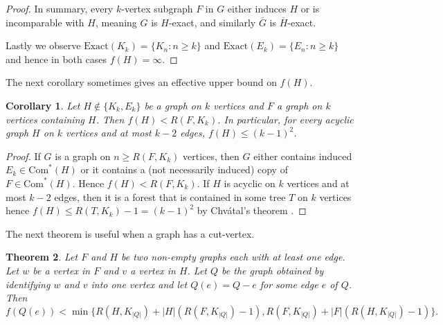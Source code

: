 \documentclass[a4paper,12pt]{article}
\newtheorem{theorem}{Theorem}[section]
\newtheorem{corollary}[theorem]{Corollary}
\begin{document}
\begin{proof}
In summary, every $k$-vertex subgraph $F$ in $G$ either induces $H$ or is incomparable with $H$, meaning $G$ is $H$-exact, and similarly  $\overline{G}$ is $\overline{H}$-exact.

 
Lastly we observe $\text{Exact}(K_k)=\{K_n: n\geq k\}$ and $\text{Exact}(E_k)=\{E_n: n\geq k\}$ and hence in both cases $f(H)= \infty$.
\end{proof}
The next corollary sometimes gives an effective upper bound on $f(H)$. 

\begin{corollary} \label{ub_ramsey}
Let $H \notin \{K_k,E_k\}$ be a graph on $k$  vertices and $F$  a graph on $k$ vertices containing $H$. Then $f(H) < R(F, K_k)$. In particular, for every acyclic graph $H$ on $k$ vertices and at most $k-2$ edges, $f(H) \leq (k-1)^2$.
\end{corollary}
\begin{proof}

If $G$ is a graph on $n \geq R(F, K_k)$ vertices, then  $G$ either contains induced $E_k \in \text{Com}^*(H)$ or it contains  a (not necessarily induced) copy of $F  \in \text{Com}^*(H)$.  Hence $f(H) < R(F, K_k)$.  If $H$ is acyclic on $k$ vertices and at most $k-2$ edges, then it is a forest  that is contained in some tree $T$ on $k$ vertices hence $f(H) \leq R(T,K_k) - 1 = (k-1)^2$ by Chv\'atal's theorem \cite{Chvtal1977TreecompleteGR}.  
\end{proof}

The next theorem is useful when a graph has a cut-vertex.

\begin{theorem}\label{impthm}
Let $F$ and $H$ be two non-empty graphs each with at least one edge.  Let $w$ be a vertex in $F$ and $v$ a vertex in $H$.  Let $Q$ be the graph obtained by identifying $w$ and $v$ into one vertex and let $Q(e)=Q-e$ for some edge $e$ of $Q$.  Then \[f(Q(e))  <  \min \{ R(H,K_{|Q|} ) +  |H|(R(F,K_{|Q|}) - 1) , R(F,K_{|Q|} ) +  |F|( R(H,K_{|Q|} )- 1)  \}.\]
\end{theorem}
\end{document}
